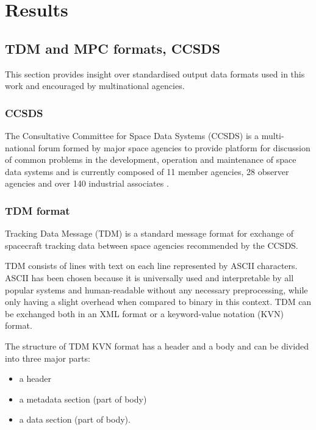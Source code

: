\chapter{Results}\label{chap:results}

\section{TDM and MPC formats, CCSDS}\label{sec:tdm_ccsds}

	This section provides insight over standardised output data formats used in this work and encouraged by multinational agencies. 

\subsection{CCSDS}\label{subsec:ccsds}
	The Consultative Committee for Space Data Systems (CCSDS) is a multi-national forum formed by major space agencies to provide platform for discussion of common problems in the development, operation and maintenance of space data systems and is currently composed of 11 member agencies, 28 observer agencies and over 140 industrial associates \citep{ccsds}.

\subsection{TDM format}

	Tracking Data Message (TDM) is a standard message format for exchange of spacecraft tracking data between space agencies recommended by the CCSDS.
	
	TDM consists of lines with text on each line represented by ASCII characters. ASCII has been chosen because it is universally used and interpretable by all popular systems and human-readable without any necessary preprocessing, while only having a slight overhead when compared to binary in this context. TDM can be exchanged both in an XML format or a keyword-value notation (KVN) format.
	
	The structure of TDM KVN format has a header and a body and can be divided into three major parts:
	
	\begin{itemize}
		\item a header
		\item a metadata section (part of body)
		\item a data section (part of body).
	\end{itemize}
	
